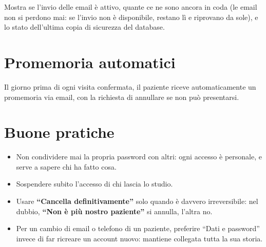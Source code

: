 \documentclass[11pt,a4paper]{article}
\newcommand{\bottone}[1]{\textbf{``#1''}}
\begin{document}
Mostra se l'invio delle email è attivo, quante ce ne sono ancora in coda (le email non si perdono mai: se l'invio non è disponibile, restano lì e riprovano da sole), e lo stato dell'ultima copia di sicurezza del database.

\section{Promemoria automatici}

Il giorno prima di ogni visita confermata, il paziente riceve automaticamente un promemoria via email, con la richiesta di annullare se non può presentarsi.

\section{Buone pratiche}

\begin{itemize}
  \item Non condividere mai la propria password con altri: ogni accesso è personale, e serve a sapere chi ha fatto cosa.
  \item Sospendere subito l'accesso di chi lascia lo studio.
  \item Usare \bottone{Cancella definitivamente} solo quando è davvero irreversibile: nel dubbio, \bottone{Non è più nostro paziente} si annulla, l'altra no.
  \item Per un cambio di email o telefono di un paziente, preferire ``Dati e password'' invece di far ricreare un account nuovo: mantiene collegata tutta la sua storia.
\end{itemize}
\end{document}
